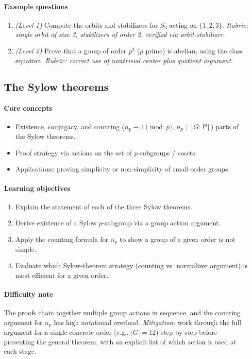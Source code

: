 \documentclass{article}
\begin{document}
\paragraph{Example questions}
\begin{enumerate}[nosep]
  \item \emph{(Level 1)} Compute the orbits and stabilizers for $S_3$ acting on $\{1,2,3\}$. \emph{Rubric: single orbit of size 3, stabilizers of order 2, verified via orbit-stabilizer.}
  \item \emph{(Level 2)} Prove that a group of order $p^2$ ($p$ prime) is abelian, using the class equation. \emph{Rubric: correct use of nontrivial center plus quotient argument.}
\end{enumerate}

\subsection{The Sylow theorems}
\paragraph{Core concepts}
\begin{itemize}[nosep]
  \item Existence, conjugacy, and counting ($n_p \equiv 1 \pmod p$, $n_p \mid [G:P]$) parts of the Sylow theorems.
  \item Proof strategy via actions on the set of $p$-subgroups / cosets.
  \item Applications: proving simplicity or non-simplicity of small-order groups.
\end{itemize}
\paragraph{Learning objectives}
\begin{enumerate}[nosep]
  \item Explain the statement of each of the three Sylow theorems.
  \item Derive existence of a Sylow $p$-subgroup via a group action argument.
  \item Apply the counting formula for $n_p$ to show a group of a given order is not simple.
  \item Evaluate which Sylow-theorem strategy (counting vs. normalizer argument) is most efficient for a given order.
\end{enumerate}
\paragraph{Difficulty note}
The proofs chain together multiple group actions in sequence, and the counting argument for $n_p$ has high notational overload. \emph{Mitigation:} work through the full argument for a single concrete order (e.g., $|G|=12$) step by step before presenting the general theorem, with an explicit list of which action is used at each stage.
\end{document}
